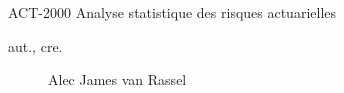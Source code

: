 \begin{contrib}{ACT-2000\: Analyse statistique des risques actuarielles}
\begin{description}
	\item[aut., cre.] Alec James van Rassel
\end{description}
\end{contrib}
